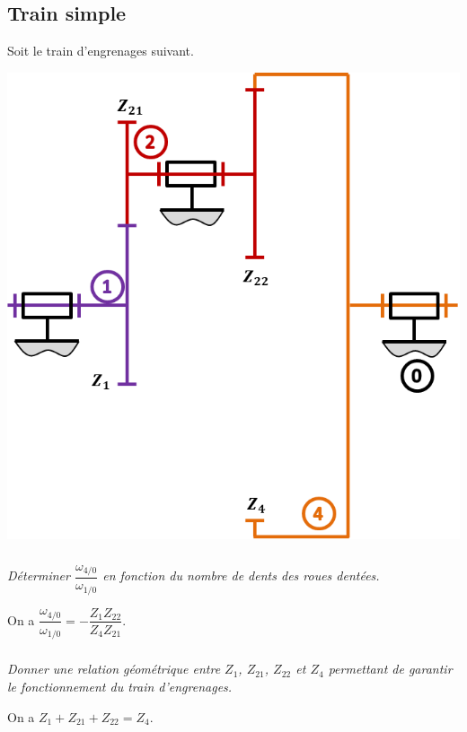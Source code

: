 \documentclass[10pt,fleqn]{article} %
\begin{document}

\vspace{5.5cm}
\pagestyle{fancy}
\thispagestyle{plain}


\def\columnseprulecolor{\color{ocre}}
\setlength{\columnseprule}{0.4pt} 

\begin{multicols}{2}

\section*{Train simple}
\setcounter{exo}{0}
Soit le train d'engrenages suivant. 
\begin{center}
\includegraphics[width=.7\linewidth]{images/TrainSimple_02}
\end{center}


\subparagraph{}
\textit{Déterminer $\dfrac{\omega_{4/0}}{\omega_{1/0}}$ en fonction du nombre de dents des roues dentées.}
\ifprof
\begin{corrige}
On a $\dfrac{\omega_{4/0}}{\omega_{1/0}}=-\dfrac{Z_1Z_{22}}{Z_4Z_{21}}$.
\end{corrige}
\else
\fi

\subparagraph{}
\textit{Donner une relation géométrique entre $Z_1$, $Z_{21}$, $Z_{22}$ et $Z_4$ permettant de garantir le fonctionnement du train d'engrenages. }
\ifprof
\begin{corrige}
On a $Z_1+Z_{21}+Z_{22}= Z_4$.
\end{corrige}
\else
\fi





\end{multicols}
\end{document}

